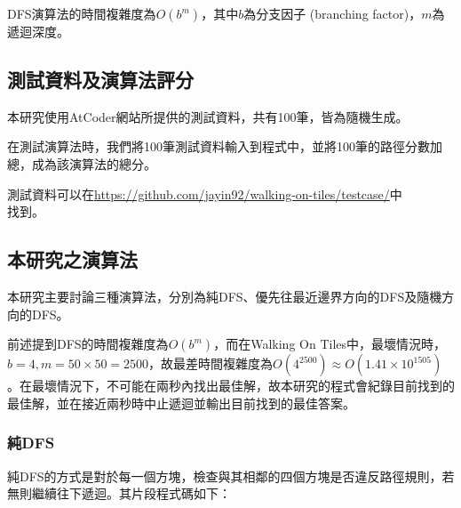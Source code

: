 \documentclass[12pt, a4paper]{article}
\begin{document}
DFS演算法的時間複雜度為$O(b^m)$，其中$b$為分支因子 (branching factor)，$m$為遞迴深度。


\subsection{測試資料及演算法評分}

本研究使用AtCoder網站所提供的測試資料，共有100筆，皆為隨機生成。

在測試演算法時，我們將100筆測試資料輸入到程式中，並將100筆的路徑分數加總，成為該演算法的總分。

測試資料可以在\url{https://github.com/jayin92/walking-on-tiles/testcase/}中 \\ 找到。

\subsection{本研究之演算法}
本研究主要討論三種演算法，分別為純DFS、優先往最近邊界方向的DFS及隨機方向的DFS。

前述提到DFS的時間複雜度為$O(b^m)$，而在Walking On Tiles中，最壞情況時，$b=4, m=50\times50=2500$，故最差時間複雜度為$O(4^{2500}) \approx O(1.41 \times 10^{1505})$。在最壞情況下，不可能在兩秒內找出最佳解，故本研究的程式會紀錄目前找到的最佳解，並在接近兩秒時中止遞迴並輸出目前找到的最佳答案。

\subsubsection{純DFS}

純DFS的方式是對於每一個方塊，檢查與其相鄰的四個方塊是否違反路徑規則，若無則繼續往下遞迴。其片段程式碼如下：
\end{document}
